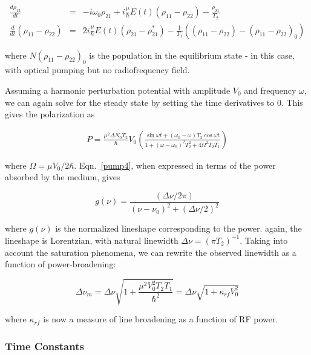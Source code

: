 \begin{eqnarray}
\frac{d\rho_{12}}{dt} &=& -i\omega_0\rho_{21} + i\frac{\mu}{\hbar}E(t)(\rho_{11} - \rho_{22}) - \frac{\rho_{21}}{T_2}\\
\frac{d}{dt}(\rho_{11} - \rho_{22}) &=& 2i\frac{\mu}{\hbar}E(t)(\rho_{21} - \rho_{21}^*) - \frac{1}{T_1}((\rho_{11} - \rho_{22}) - (\rho_{11} - \rho_{22})_0)
\label{pump3}
\end{eqnarray}

where $N(\rho_{11} - \rho_{22})_0$ is the population in the
equilibrium state - in this case, with optical pumping but no radiofrequency
field.

Assuming a harmonic perturbation potential with amplitude $V_0$ and
frequency $\omega$, we can again solve for the steady state by setting
the time derivatives to $0$. This gives the polarization as

\begin{eqnarray}
P = \frac{\mu^2\Delta N_0 T_2}{\hbar}V_0\left(\frac{\sin\omega t + (\omega_0 - \omega)T_2\cos\omega t}{1 + (\omega - \omega_0)^2T_2^2 + 4\Omega^2T_2T_1}\right)
\label{pump4}
\end{eqnarray}

where $\Omega = \mu V_0/2\hbar$. Eqn.~\ref{pump4}, when expressed in
terms of the power absorbed by the medium, gives 

\begin{equation}
g(\nu) = \frac{(\Delta\nu/2\pi)}{(\nu-\nu_0)^2 +(\Delta\nu/2)^2}
\label{eqn:gamma1}
\end{equation}

where $g(\nu)$ is the normalized lineshape corresponding to the power. again, the lineshape is Lorentzian, with natural linewidth $\Delta\nu = (\pi T_2)^{-1}$. Taking into account the saturation phenomena, we can rewrite the observed linewidth as a function of power-broadening:

\begin{equation}
\Delta\nu_m = \Delta\nu\sqrt{1+\frac{\mu^2V_0^2T_2T_1}{\hbar^2}} = \Delta\nu\sqrt{1+\kappa_{rf}V_0^2}
\label{eqn:kapparf}
\end{equation}

where $\kappa_{rf}$ is now a measure of line broadening as a function of RF power\cite{yariv}.


\subsubsection{Time Constants}\label{timeconstants}

